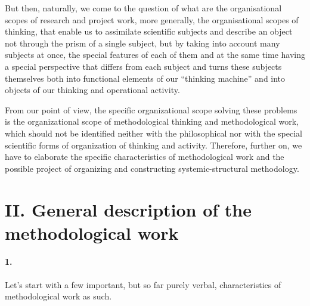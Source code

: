 \documentclass[11pt,a4paper]{article}
\begin{document}
But then, naturally, we come to the question of what are the organisational
scopes of research and project work, more generally, the organisational scopes
of thinking, that enable us to assimilate scientific subjects and describe an
object not through the prism of a single subject, but by taking into account
many subjects at once, the special features of each of them and at the same
time having a special perspective that differs from each subject and turns
these subjects themselves both into functional elements of our “thinking
machine” and into objects of our thinking and operational activity.

From our point of view, the specific organizational scope solving these
problems is the organizational scope of methodological thinking and
methodological work, which should not be identified neither with the
philosophical nor with the special scientific forms of organization of
thinking and activity. Therefore, further on, we have to elaborate the
specific characteristics of methodological work and the possible project of
organizing and constructing systemic-structural methodology.

\section*{II. General description of the methodological work}

\paragraph{1.}
Let's start with a few important, but so far purely verbal, characteristics of
methodological work as such.
\end{document}
